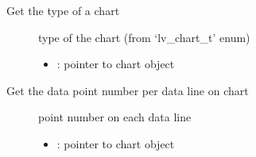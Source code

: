 \documentclass[letterpaper,10pt,english]{sphinxmanual}
\begin{document}
\begin{fulllineitems}
\label{\detokenize{object-types/chart:_CPPv417lv_chart_get_typePK8lv_obj_t}}%
\pysigstartmultiline
{}\label{\detokenize{object-types/chart:lv__chart_8h_1a1fe1423df4816e09ea874d66fb43cbdf}}%
\pysigstopmultiline
Get the type of a chart \begin{description}
\item[{}] \leavevmode
type of the chart (from ‘lv\_chart\_t’ enum) 

\item[{}] \leavevmode\begin{itemize}
\item {} 
: pointer to chart object 

\end{itemize}

\end{description}


\end{fulllineitems}


\begin{fulllineitems}
\label{\detokenize{object-types/chart:_CPPv422lv_chart_get_point_cntPK8lv_obj_t}}%
\pysigstartmultiline
{}\label{\detokenize{object-types/chart:lv__chart_8h_1aae9841db22df305f09d2afe503bef897}}%
\pysigstopmultiline
Get the data point number per data line on chart \begin{description}
\item[{}] \leavevmode
point number on each data line 

\item[{}] \leavevmode\begin{itemize}
\item {} 
: pointer to chart object 

\end{itemize}

\end{description}


\end{fulllineitems}
\end{document}
